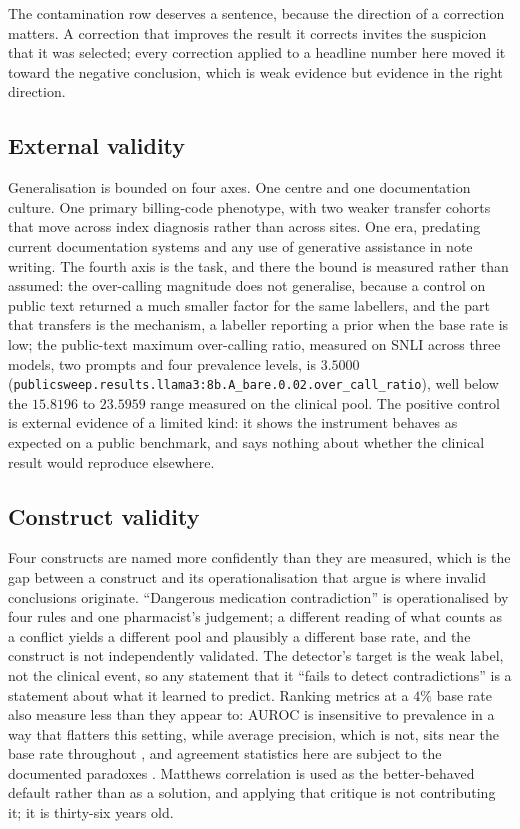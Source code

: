 The contamination row deserves a sentence, because the direction of a correction
matters. A correction that improves the result it corrects invites the suspicion
that it was selected; every correction applied to a headline number here moved it
toward the negative conclusion, which is weak evidence but evidence in the right
direction.

\subsection{External validity}

Generalisation is bounded on four axes. One centre and one documentation culture.
One primary billing-code phenotype, with two weaker transfer cohorts that move
across index diagnosis rather than across sites. One era, predating current
documentation systems and any use of generative assistance in note writing. The
fourth axis is the task, and there the bound is measured rather than assumed: the
over-calling magnitude does not generalise, because a control on public text
returned a much smaller factor for the same labellers, and the part that
transfers is the mechanism, a labeller reporting a prior when the base rate is
low; the public-text maximum over-calling ratio, measured on SNLI across three
models, two prompts and four prevalence levels, is $3.5000$
(\texttt{publicsweep.results.llama3:8b.A\_bare.0.02.over\_call\_ratio}), well
below the $15.8196$ to $23.5959$ range measured on the clinical pool.
The positive control is external evidence of a
limited kind: it shows the instrument behaves as expected on a public benchmark,
and says nothing about whether the clinical result would reproduce elsewhere.

\subsection{Construct validity}

Four constructs are named more confidently than they are measured, which is the
gap between a construct and its operationalisation that
\citet{jacobs2021measurement} argue is where invalid conclusions originate.
``Dangerous medication contradiction'' is operationalised by four rules and one
pharmacist's judgement; a different reading of what counts as a conflict yields a
different pool and plausibly a different base rate, and the construct is not
independently validated. The detector's target is the weak label, not the
clinical event, so any statement that it ``fails to detect contradictions'' is a
statement about what it learned to predict. Ranking metrics at a $4\%$ base rate
also measure less than they appear to: AUROC is insensitive to prevalence in a
way that flatters this setting, while average precision, which is not, sits near
the base rate throughout \citep{saito2015prcurve}, and agreement statistics here
are subject to the documented paradoxes
\citep{feinstein1990paradoxes,cicchetti1990resolving,byrt1993pabak}. Matthews
correlation is used as the better-behaved default
\citep{chicco2020mcc,delgado2019kappa} rather than as a solution, and applying
that critique is not contributing it; it is thirty-six years old.

